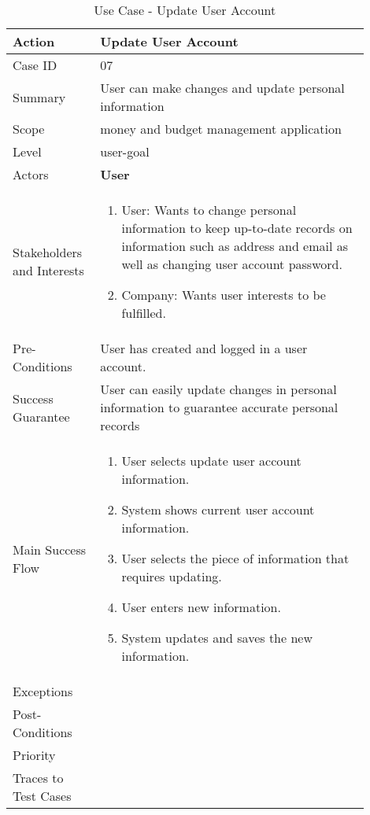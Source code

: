 \documentclass[11pt]{article}
\newcounter{use case ID}
\newcommand\tabularhead[1]{
\begin{table}[ht]
    \addtocounter{use case ID}{1}
    \caption{Use Case \arabic{use case ID} - #1}
    \vspace{0.2cm}
    \begin{tabular}{|p{0.2\linewidth}|p{0.70\linewidth}|}
    \hline
        \textbf{Action} & \textbf{#1} \\
        \hline}
\newcommand\addrow[2]{#1 & #2\\ \hline}
\newcommand\addmulrow[2]{ \begin{minipage}[t][][t]{2.5cm}#1\end{minipage}
        &\begin{minipage}[t][][t]{11cm}
        \begin{enumerate}[itemsep=-1ex] #2   \end{enumerate}
    \end{minipage}\vfill\\ \hline}
\newenvironment{usecase}{\tabularhead}
{\hline\end{tabular}\end{table}}
\newcounter{req ID}
\begin{document}
\begin{usecase}{Update User Account}
    \addrow{Case ID}{07}
    \addrow{Summary}{User can make changes and update personal information}
    \addrow{Scope}{money and budget management application}
    \addrow{Level}{user-goal}
    \addrow{Actors}{\textbf{User}}
    \addmulrow{Stakeholders and Interests}{
        \item User:  Wants to change personal information to keep up-to-date records on information such as address and email as well as changing user account password.
        \item Company: Wants user interests to be fulfilled. }
    \addrow{Pre-Conditions}{User has created and logged in a user account.}
    \addrow{Success Guarantee}{User can easily update changes in personal information to guarantee accurate personal records }
    \addmulrow{Main Success Flow}{
        \item User selects update user account information.
        \item System shows current user account information.
        \item User selects the piece of information that requires updating.
        \item User enters new information.
        \item System updates and saves the new information.
    }
    \addrow{Exceptions}{}
    \addrow{Post-Conditions}{}
    \addrow{Priority}{}
    \addrow{Traces to Test Cases}{}
\end{usecase}
\end{document}
